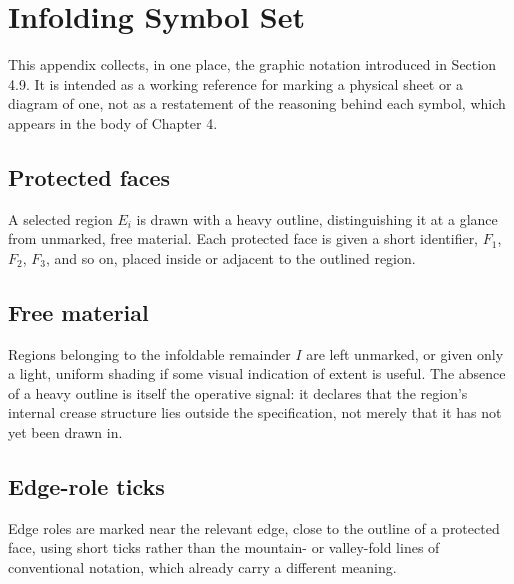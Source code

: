 \documentclass[11pt,oneside]{book}
\begin{document}
\appendix

\hypertarget{appendix-a.-infolding-symbol-set}{%
\chapter{Infolding Symbol
Set}\label{appendix-a.-infolding-symbol-set}}

This appendix collects, in one place, the graphic notation introduced in
Section 4.9. It is intended as a working reference for marking a
physical sheet or a diagram of one, not as a restatement of the
reasoning behind each symbol, which appears in the body of Chapter 4.

\hypertarget{protected-faces}{%
\section{Protected faces}\label{protected-faces}}

A selected region \(E_i\) is drawn with a heavy outline, distinguishing
it at a glance from unmarked, free material. Each protected face is
given a short identifier, \(F_1\), \(F_2\), \(F_3\), and so on, placed
inside or adjacent to the outlined region.

\hypertarget{free-material}{%
\section{Free material}\label{free-material}}

Regions belonging to the infoldable remainder \(I\) are left unmarked,
or given only a light, uniform shading if some visual indication of
extent is useful. The absence of a heavy outline is itself the operative
signal: it declares that the region's internal crease structure lies
outside the specification, not merely that it has not yet been drawn in.

\hypertarget{edge-role-ticks}{%
\section{Edge-role ticks}\label{edge-role-ticks}}

Edge roles are marked near the relevant edge, close to the outline of a
protected face, using short ticks rather than the mountain- or
valley-fold lines of conventional notation, which already carry a
different meaning.
\end{document}
